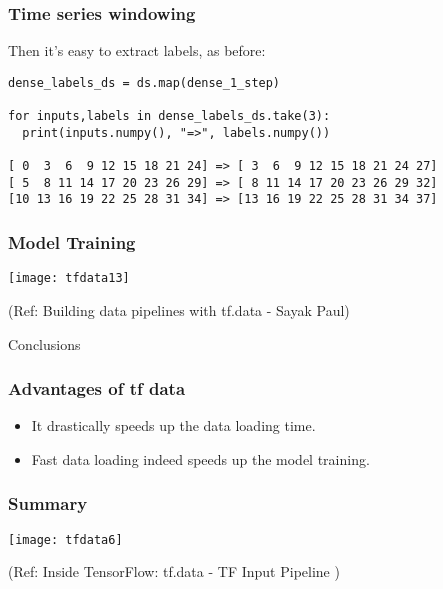 \begin{frame}[fragile]\frametitle{Time series windowing}

Then it's easy to extract labels, as before:


\begin{lstlisting}
dense_labels_ds = ds.map(dense_1_step)

for inputs,labels in dense_labels_ds.take(3):
  print(inputs.numpy(), "=>", labels.numpy())
	
[ 0  3  6  9 12 15 18 21 24] => [ 3  6  9 12 15 18 21 24 27]
[ 5  8 11 14 17 20 23 26 29] => [ 8 11 14 17 20 23 26 29 32]
[10 13 16 19 22 25 28 31 34] => [13 16 19 22 25 28 31 34 37]
\end{lstlisting}
\end{frame}

\begin{frame}[fragile]\frametitle{Model Training}

\begin{center}
\texttt{[image: tfdata13]}

{\tiny (Ref: Building data pipelines with tf.data - Sayak Paul)}

\end{center}
\end{frame}

\begin{frame}
  \begin{center}
    {\Large Conclusions}
	
  \end{center}
\end{frame}

\begin{frame}[fragile]\frametitle{Advantages of tf data}
\begin{itemize}
\item It drastically speeds up the data loading time.
\item Fast data loading indeed speeds up the model training. 
\end{itemize}
\end{frame}

\begin{frame}[fragile]\frametitle{Summary}

\begin{center}
\texttt{[image: tfdata6]}

{\tiny (Ref: Inside TensorFlow: tf.data - TF Input Pipeline )}

\end{center}
\end{frame}